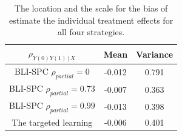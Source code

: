 \begin{table}[ht!]
	\centering
	\begin{tabular}{c|cc}
		$\rho_{Y(0)Y(1)\,|\ X}$                       & Mean   & Variance \\
		\hline                              
		BLI-SPC $\rho_{partial} = 0$       & -0.012     & 0.791 \\
		BLI-SPC $\rho_{partial} = 0.73$    & -0.007     & 0.363 \\
		BLI-SPC $\rho_{partial} = 0.99$    & -0.013     & 0.398 \\
		The targeted learning         & -0.006 & 0.401 
	\end{tabular}
	\caption{The location and the scale for the bias of estimate the individual treatment effects for all four strategies.}
	\label{tab4_1}
\end{table} 

